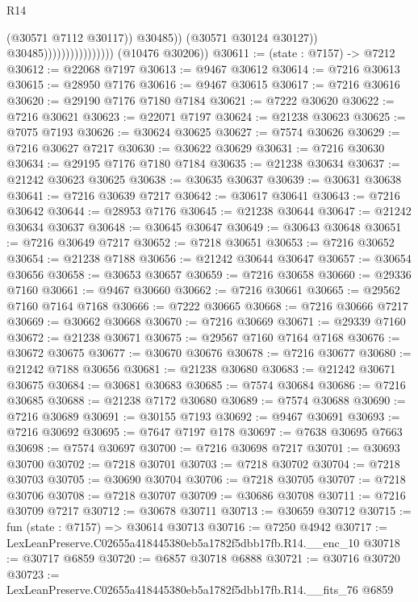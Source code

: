 \begin{lexlean}{R14}
\begin{coremodule}
                                              (@30571 @7112 @30117))
                                            @30485))
                                        (@30571 @30124 @30127))
                                      @30485))))))))))))))))
      (@10476 @30206))
@30611 := (state : @7157) -> @7212
@30612 := @22068 @7197
@30613 := @9467 @30612
@30614 := @7216 @30613
@30615 := @28950 @7176
@30616 := @9467 @30615
@30617 := @7216 @30616
@30620 := @29190 @7176 @7180 @7184
@30621 := @7222 @30620
@30622 := @7216 @30621
@30623 := @22071 @7197
@30624 := @21238 @30623
@30625 := @7075 @7193
@30626 := @30624 @30625
@30627 := @7574 @30626
@30629 := @7216 @30627 @7217
@30630 := @30622 @30629
@30631 := @7216 @30630
@30634 := @29195 @7176 @7180 @7184
@30635 := @21238 @30634
@30637 := @21242 @30623 @30625
@30638 := @30635 @30637
@30639 := @30631 @30638
@30641 := @7216 @30639 @7217
@30642 := @30617 @30641
@30643 := @7216 @30642
@30644 := @28953 @7176
@30645 := @21238 @30644
@30647 := @21242 @30634 @30637
@30648 := @30645 @30647
@30649 := @30643 @30648
@30651 := @7216 @30649 @7217
@30652 := @7218 @30651
@30653 := @7216 @30652
@30654 := @21238 @7188
@30656 := @21242 @30644 @30647
@30657 := @30654 @30656
@30658 := @30653 @30657
@30659 := @7216 @30658
@30660 := @29336 @7160
@30661 := @9467 @30660
@30662 := @7216 @30661
@30665 := @29562 @7160 @7164 @7168
@30666 := @7222 @30665
@30668 := @7216 @30666 @7217
@30669 := @30662 @30668
@30670 := @7216 @30669
@30671 := @29339 @7160
@30672 := @21238 @30671
@30675 := @29567 @7160 @7164 @7168
@30676 := @30672 @30675
@30677 := @30670 @30676
@30678 := @7216 @30677
@30680 := @21242 @7188 @30656
@30681 := @21238 @30680
@30683 := @21242 @30671 @30675
@30684 := @30681 @30683
@30685 := @7574 @30684
@30686 := @7216 @30685
@30688 := @21238 @7172 @30680
@30689 := @7574 @30688
@30690 := @7216 @30689
@30691 := @30155 @7193
@30692 := @9467 @30691
@30693 := @7216 @30692
@30695 := @7647 @7197 @178
@30697 := @7638 @30695 @7663
@30698 := @7574 @30697
@30700 := @7216 @30698 @7217
@30701 := @30693 @30700
@30702 := @7218 @30701
@30703 := @7218 @30702
@30704 := @7218 @30703
@30705 := @30690 @30704
@30706 := @7218 @30705
@30707 := @7218 @30706
@30708 := @7218 @30707
@30709 := @30686 @30708
@30711 := @7216 @30709 @7217
@30712 := @30678 @30711
@30713 := @30659 @30712
@30715 := fun (state : @7157) => @30614 @30713
@30716 := @7250 @4942
@30717 := LexLeanPreserve.C02655a418445380eb5a1782f5dbb17fb.R14.__enc_10
@30718 := @30717 @6859
@30720 := @6857 @30718 @6888
@30721 := @30716 @30720
@30723 := LexLeanPreserve.C02655a418445380eb5a1782f5dbb17fb.R14.__fits_76 @6859

\end{coremodule}
\end{lexlean}
